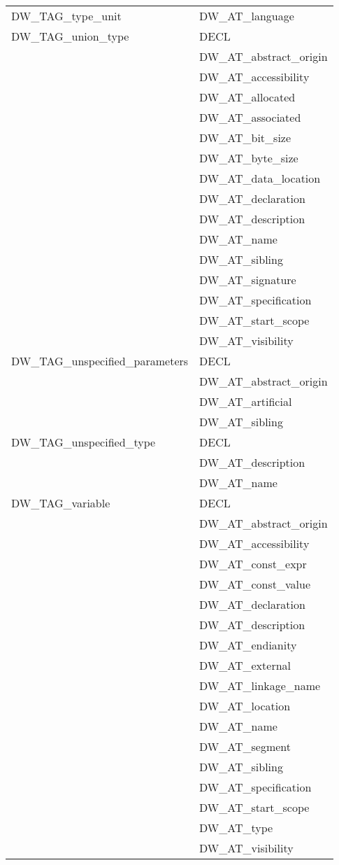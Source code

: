 \begin{longtable}{l|p{8cm}}
DW\_TAG\_type\_unit
&DW\_AT\_language   \\

DW\_TAG\_union\_type
&DECL   \\
&DW\_AT\_abstract\_origin   \\
&DW\_AT\_accessibility   \\
&DW\_AT\_allocated   \\
&DW\_AT\_associated   \\
&DW\_AT\_bit\_size   \\
&DW\_AT\_byte\_size   \\
&DW\_AT\_data\_location   \\
&DW\_AT\_declaration   \\
&DW\_AT\_description   \\
&DW\_AT\_name   \\
&DW\_AT\_sibling   \\
&DW\_AT\_signature   \\
&DW\_AT\_specification   \\
&DW\_AT\_start\_scope   \\
&DW\_AT\_visibility   \\


DW\_TAG\_unspecified\_parameters
&DECL   \\
&DW\_AT\_abstract\_origin   \\
&DW\_AT\_artificial   \\
&DW\_AT\_sibling   \\

DW\_TAG\_unspecified\_type
&DECL   \\
&DW\_AT\_description   \\
&DW\_AT\_name    \\


DW\_TAG\_variable
&DECL    \\
&DW\_AT\_abstract\_origin    \\
&DW\_AT\_accessibility    \\
&DW\_AT\_const\_expr    \\
&DW\_AT\_const\_value    \\
&DW\_AT\_declaration    \\
&DW\_AT\_description    \\
&DW\_AT\_endianity    \\
&DW\_AT\_external    \\
&DW\_AT\_linkage\_name    \\
&DW\_AT\_location    \\
&DW\_AT\_name    \\
&DW\_AT\_segment    \\
&DW\_AT\_sibling    \\
&DW\_AT\_specification    \\
&DW\_AT\_start\_scope    \\
&DW\_AT\_type    \\
&DW\_AT\_visibility    \\


\end{longtable}
